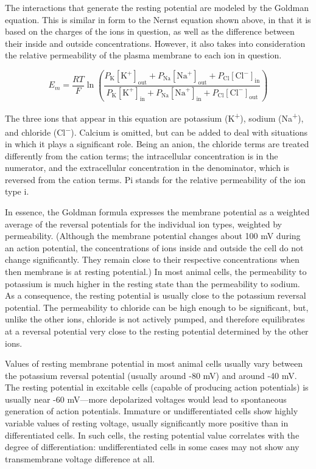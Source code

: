 The interactions that generate the resting potential are modeled by the Goldman equation. This is similar in form to the Nernst equation shown above, in that it is based on the charges of the ions in question, as well as the difference between their inside and outside concentrations. However, it also takes into consideration the relative permeability of the plasma membrane to each ion in question.

\[ E_{m} = \frac{RT}{F} \ln{ \left( \frac{ P_{\mathrm{K}}[\mathrm{K}^{+}]_\mathrm{out} + P_{\mathrm{Na}}[\mathrm{Na}^{+}]_\mathrm{out} + P_{\mathrm{Cl}}[\mathrm{Cl}^{-}]_\mathrm{in}}{ P_{\mathrm{K}}[\mathrm{K}^{+}]_\mathrm{in} + P_{\mathrm{Na}}[\mathrm{Na}^{+}]_\mathrm{in} + P_{\mathrm{Cl}}[\mathrm{Cl}^{-}]_\mathrm{out}} \right) } \]

The three ions that appear in this equation are potassium (K\textsuperscript{+}), sodium (Na\textsuperscript{+}), and chloride (Cl\textsuperscript{−}). Calcium is omitted, but can be added to deal with situations in which it plays a significant role. Being an anion, the chloride terms are treated differently from the cation terms; the intracellular concentration is in the numerator, and the extracellular concentration in the denominator, which is reversed from the cation terms. Pi stands for the relative permeability of the ion type i.

In essence, the Goldman formula expresses the membrane potential as a weighted average of the reversal potentials for the individual ion types, weighted by permeability. (Although the membrane potential changes about 100 mV during an action potential, the concentrations of ions inside and outside the cell do not change significantly. They remain close to their respective concentrations when then membrane is at resting potential.) In most animal cells, the permeability to potassium is much higher in the resting state than the permeability to sodium. As a consequence, the resting potential is usually close to the potassium reversal potential. The permeability to chloride can be high enough to be significant, but, unlike the other ions, chloride is not actively pumped, and therefore equilibrates at a reversal potential very close to the resting potential determined by the other ions.

Values of resting membrane potential in most animal cells usually vary between the potassium reversal potential (usually around -80 mV) and around -40 mV. The resting potential in excitable cells (capable of producing action potentials) is usually near -60 mV---more depolarized voltages would lead to spontaneous generation of action potentials. Immature or undifferentiated cells show highly variable values of resting voltage, usually significantly more positive than in differentiated cells. In such cells, the resting potential value correlates with the degree of differentiation: undifferentiated cells in some cases may not show any transmembrane voltage difference at all.

